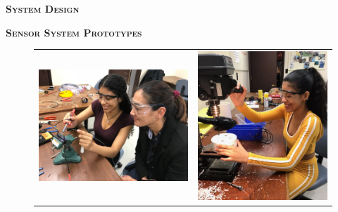 \documentclass[final,t]{beamer}
\begin{document}
\begin{frame}{}
\begin{columns}
\begin{column}{.5\linewidth}
\begin{alertblock}{\textsc{\textbf{System Design}}}
\begin{block}{\textsc{\textbf{Sensor System Prototypes}}}

                    \begin{center}
                    \begin{figure}
                    \begin{tabular}{cc}
                    \includegraphics[scale = 0.15]{assets/IMG_9097.JPG}
                    \hspace*{5mm}
                    &
                    \includegraphics[scale = 0.42]{assets/meworking1}

\end{tabular}
\end{figure}
\end{center}
\end{block}
\end{alertblock}
\end{column}
\end{columns}
\end{frame}
\end{document}
